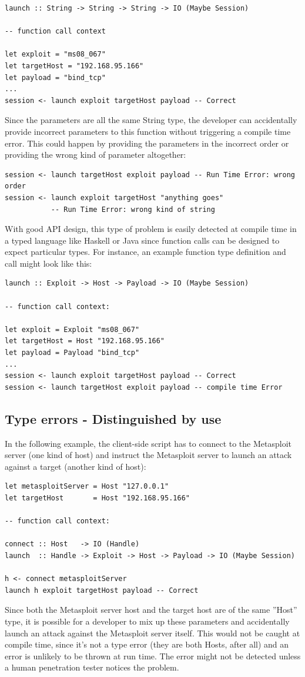 \documentclass[figure,letterpaper,onefignum]{mysiam}
\begin{document}
\begin{verbatim}
launch :: String -> String -> String -> IO (Maybe Session)

-- function call context

let exploit = "ms08_067"
let targetHost = "192.168.95.166"
let payload = "bind_tcp"
...
session <- launch exploit targetHost payload -- Correct
\end{verbatim}
Since the parameters are all the same String type, the developer can accidentally provide incorrect parameters to this function without triggering a compile time error. This could happen by providing the parameters in the incorrect order or providing the wrong kind of parameter altogether:

\begin{verbatim}
session <- launch targetHost exploit payload -- Run Time Error: wrong order
session <- launch exploit targetHost "anything goes"
           -- Run Time Error: wrong kind of string
\end{verbatim}
With good API design, this type of problem is easily detected at compile time in a typed language like Haskell or Java since function calls can be designed to expect particular types. For instance, an example function type definition and call might look like this:

\begin{verbatim}
launch :: Exploit -> Host -> Payload -> IO (Maybe Session)

-- function call context:

let exploit = Exploit "ms08_067"
let targetHost = Host "192.168.95.166"
let payload = Payload "bind_tcp"
...
session <- launch exploit targetHost payload -- Correct
session <- launch targetHost exploit payload -- compile time Error
\end{verbatim}

\subsection{Type errors - Distinguished by use}
In the following example, the client-side script has to connect to the Metasploit server (one kind of host) and instruct the Metasploit server to launch an attack against a target (another kind of host):

\begin{verbatim}
let metasploitServer = Host "127.0.0.1"
let targetHost       = Host "192.168.95.166"

-- function call context:

connect :: Host   -> IO (Handle)
launch  :: Handle -> Exploit -> Host -> Payload -> IO (Maybe Session)

h <- connect metasploitServer
launch h exploit targetHost payload -- Correct
\end{verbatim}
Since both the Metasploit server host and the target host are of the same ''Host'' type, it is possible for a developer to mix up these parameters and accidentally launch an attack against the Metasploit server itself. This would not be caught at compile time, since it's not a type error (they are both Hosts, after all) and an error is unlikely to be thrown at run time. The error might not be detected unless a human penetration tester notices the problem.
\end{document}
